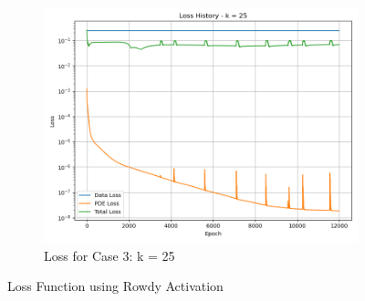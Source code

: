 \documentclass[11pt]{article}
\begin{document}
\begin{figure}[h!]
\begin{subfigure}[b]{0.48\textwidth}
        \includegraphics[width=\textwidth]{2D_Loss_K3.png}
        \caption{Loss for Case 3: k = 25}
        \label{fig:Loss_K3_Rowdy}
    \end{subfigure}
    \caption{Loss Function using Rowdy Activation}
    \label{fig:Loss_Rowdy}
\end{figure}
\pagebreak
\end{document}
